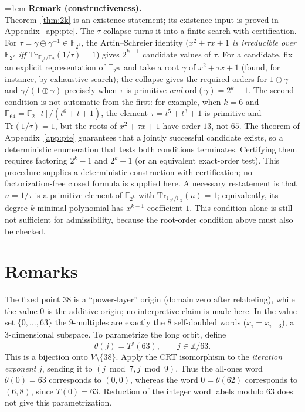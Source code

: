 \documentclass[11pt]{article}
\begin{document}
\begingroup
\emergencystretch=1em
\noindent\textbf{Remark (constructiveness).}\\
Theorem~\ref{thm:2k} is an existence statement; its existence input is proved
in Appendix~\ref{app:pte}. The $\tau$-collapse turns it into a finite search with
certification. For $\tau=\gamma\oplus\gamma^{-1}\in\mathbb{F}_{2^k}$, the
Artin--Schreier identity
(\emph{$x^2+\tau x+1$ is irreducible over $\mathbb{F}_{2^k}$ iff
$\mathrm{Tr}_{\mathbb{F}_{2^k}/\mathbb{F}_2}(1/\tau)=1$}) gives $2^{k-1}$
candidate values of $\tau$. For a candidate, fix an explicit representation of
$\mathbb{F}_{2^{2k}}$ and take a root $\gamma$ of $x^2+\tau x+1$
(found, for instance, by exhaustive search); the collapse gives the required orders for $1\oplus\gamma$ and
$\gamma/(1\oplus\gamma)$ precisely when $\tau$ is primitive \emph{and}
$\mathrm{ord}(\gamma)=2^k+1$. The second condition is not automatic from the
first: for example, when $k=6$ and
$\mathbb{F}_{64}=\mathbb{F}_2[t]/(t^6+t+1)$, the element
$\tau=t^5+t^3+1$ is primitive and $\mathrm{Tr}(1/\tau)=1$, but the roots of
$x^2+\tau x+1$ have order $13$, not $65$. The theorem of
Appendix~\ref{app:pte} guarantees that a jointly successful candidate exists, so a
deterministic enumeration that tests both conditions terminates. Certifying them requires factoring $2^k-1$ and
$2^k+1$ (or an equivalent exact-order test). This procedure supplies a
deterministic construction with certification; no factorization-free closed
formula is supplied here.
A necessary restatement is that $u=1/\tau$ is a primitive element of
$\mathbb{F}_{2^k}$ with $\mathrm{Tr}_{\mathbb{F}_{2^k}/\mathbb{F}_2}(u)=1$;
equivalently, its degree-$k$ minimal polynomial has $x^{k-1}$-coefficient
$1$. This condition alone is still not sufficient for admissibility, because
the root-order condition above must also be checked.
\endgroup

\section{Remarks}\label{sec:rem}
The fixed point $38$ is a ``power-layer'' origin (domain zero after relabeling),
while the value $0$ is the additive origin; no interpretive claim is made here.
In the value set $\{0,\dots,63\}$ the $9$-multiples are exactly the $8$
self-doubled words ($x_i=x_{i+3}$), a $3$-dimensional subspace.
To parametrize the long orbit, define
\[
\theta(j)=T^j(63),\qquad j\in\mathbb Z/63.
\]
This is a bijection onto $V\setminus\{38\}$. Apply the CRT isomorphism to the
\emph{iteration exponent} $j$, sending it to $(j\bmod7,j\bmod9)$.
Thus the all-ones word $\theta(0)=63$ corresponds to $(0,0)$, whereas the
word $0=\theta(62)$ corresponds to $(6,8)$, since $T(0)=63$.
Reduction of the integer word labels modulo $63$ does not give this parametrization.
\end{document}
